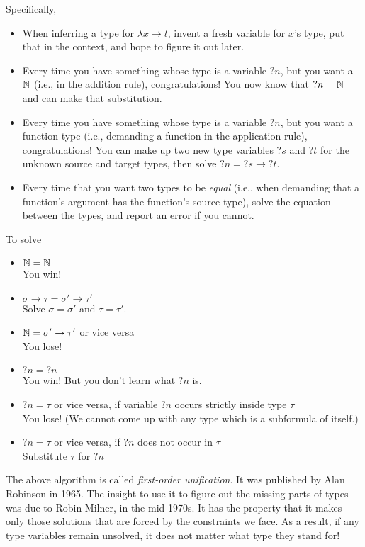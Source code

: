 \documentclass{article}
\begin{document}
Specifically,
\begin{itemize}
\item When inferring a type for $\lambda x\to t$, invent a fresh
  variable for $x$'s type, put that in the context, and hope to
  figure it out later.
\item Every time you have something whose type is a variable $?n$,
  but you want a $\mathbb{N}$ (i.e., in the addition rule), congratulations! You now know that
  $?n=\mathbb{N}$ and can make that substitution.
\item Every time you have something whose type is a variable $?n$,
  but you want a function type (i.e., demanding a function in the application rule), congratulations! You can make up
  two new type variables $?s$ and $?t$ for the unknown source and target
  types, then solve $?n=?s\to?t$.
\item Every time that you want two types to be \emph{equal} (i.e., when demanding
  that a function's argument has the function's source type), solve the
  equation between the types, and report an error if you cannot.
\end{itemize}

To solve
\begin{itemize}
\item $\mathbb{N} = \mathbb{N}$ \\ You win!
\item $\sigma\to\tau = \sigma'\to\tau'$ \\
  Solve $\sigma = \sigma'$ and $\tau = \tau'$.
\item $\mathbb{N} = \sigma'\to\tau'$ or vice versa \\ You lose!
\item $?n = ?n$ \\ You win! But you don't learn what $?n$ is.
\item $?n = \tau$ or vice versa, if variable $?n$ occurs strictly inside type $\tau$ \\
  You lose! (We cannot come up with any type which is a subformula of itself.)
\item $?n = \tau$ or vice versa, if $?n$ does not occur in $\tau$ \\
  Substitute $\tau$ for $?n$
\end{itemize}

The above algorithm is called \emph{first-order unification}. It was published by Alan
Robinson in 1965. The insight to use it to figure out the missing parts of types was
due to Robin Milner, in the mid-1970s. It has the property that it makes only those
solutions that are forced by the constraints we face. As a result, if any type
variables remain unsolved, it does not matter what type they stand for!
\end{document}

